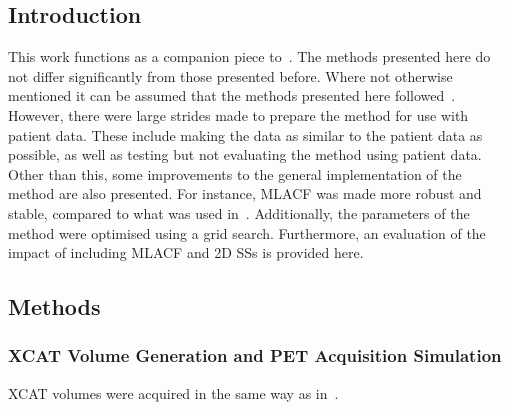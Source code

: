         \subsection{Introduction} \label{sec:evaluation_of_pet_ct_motion_correction_incorporating_motion_models_using_mlacf_and_complex_gating_schemes_introduction}
            This work functions as a companion piece to~. The methods presented here do not differ significantly from those presented before. Where not otherwise mentioned it can be assumed that the methods presented here followed~. However, there were large strides made to prepare the method for use with patient data. These include making the data as similar to the patient data as possible, as well as testing but not evaluating the method using patient data. Other than this, some improvements to the general implementation of the method are also presented. For instance, \gls{MLACF} was made more robust and stable, compared to what was used in~. Additionally, the parameters of the method were optimised using a grid search. Furthermore, an evaluation of the impact of including \gls{MLACF} and \gls{2D} \glspl{SS} is provided here.
        
        \subsection{Methods} \label{sec:evaluation_of_pet_ct_motion_correction_incorporating_motion_models_using_mlacf_and_complex_gating_schemes_methods}
            
            
            \subsubsection{XCAT Volume Generation and PET Acquisition Simulation} \label{sec:evaluation_of_pet_ct_motion_correction_incorporating_motion_models_using_mlacf_and_complex_gating_schemes_methods_xcat_volume_generation_and_pet_acquisition_simulation}
                \gls{XCAT} volumes were acquired in the same way as in~.

